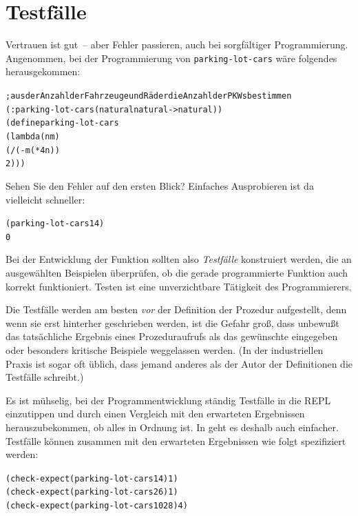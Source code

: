 \section{Testfälle}
\label{sec:test-cases}

Vertrauen ist gut~-- aber Fehler passieren, auch bei 
sorgfältiger Programmierung.  Angenommen, bei der Programmierung von
\texttt{parking-lot-cars} wäre folgendes herausgekommen:
%
\begin{alltt}
; aus der Anzahl der Fahrzeuge und Räder die Anzahl der PKWs bestimmen
(: parking-lot-cars (natural natural -> natural))
(define parking-lot-cars
  (lambda (n m)
    (/ (- m (* 4 n))
       2)))
\end{alltt}
%
Sehen Sie den Fehler auf den ersten Blick?  
Einfaches Ausprobieren ist da vielleicht schneller:
%
\begin{alltt}
(parking-lot-cars 1 4)
\evalsto{} 0
\end{alltt}
%
Bei der Entwicklung der Funktion sollten also
\textit{Testfälle} konstruiert werden, die an
ausgewählten Beispielen überprüfen, ob die gerade programmierte
Funktion auch korrekt funktioniert.  Testen ist eine unverzichtbare
Tätigkeit des Programmierers.

Die Testfälle werden am besten \emph{vor} der Definition der Prozedur
aufgestellt, denn  wenn sie erst hinterher geschrieben werden, ist die
Gefahr groß, dass unbewußt das tatsächliche Ergebnis
eines Prozeduraufrufs als das gewünschte eingegeben oder besonders
kritische Beispiele weggelassen werden.  (In der industriellen Praxis ist sogar
oft üblich, dass jemand anderes als der Autor der Definitionen
die Testfälle schreibt.)

Es ist mühselig, bei der Programmentwicklung ständig Testfälle in die
REPL einzutippen und durch einen Vergleich mit den erwarteten
Ergebnissen herauszubekommen, ob alles in Ordnung ist.  In \drscheme{}
geht es deshalb auch einfacher.  Testfälle können zusammen mit den
erwarteten Ergebnissen wie folgt spezifiziert werden:

\begin{alltt}
(check-expect (parking-lot-cars 1 4) 1)  
(check-expect (parking-lot-cars 2 6) 1)  
(check-expect (parking-lot-cars 10 28) 4)  
\end{alltt}


